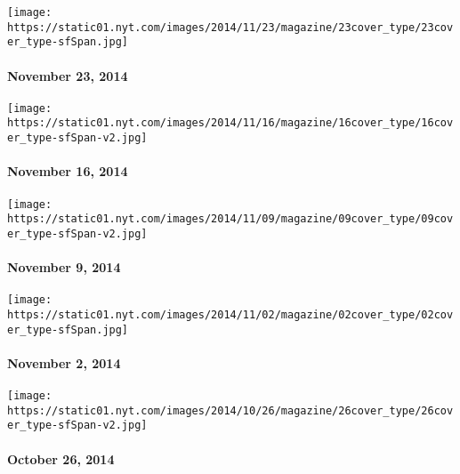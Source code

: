 \texttt{[image: https://static01.nyt.com/images/2014/11/23/magazine/23cover\_type/23cover\_type-sfSpan.jpg]}

\hypertarget{november-23-2014}{%
\paragraph{November 23, 2014}\label{november-23-2014}}

\href{http://www.nytimes.com/indexes/2014/11/16/magazine/index.html}{}

\texttt{[image: https://static01.nyt.com/images/2014/11/16/magazine/16cover\_type/16cover\_type-sfSpan-v2.jpg]}

\hypertarget{november-16-2014}{%
\paragraph{November 16, 2014}\label{november-16-2014}}

\href{http://www.nytimes.com/indexes/2014/11/09/magazine/index.html}{}

\texttt{[image: https://static01.nyt.com/images/2014/11/09/magazine/09cover\_type/09cover\_type-sfSpan-v2.jpg]}

\hypertarget{november-9-2014}{%
\paragraph{November 9, 2014}\label{november-9-2014}}

\href{http://www.nytimes.com/indexes/2014/11/02/magazine/index.html}{}

\texttt{[image: https://static01.nyt.com/images/2014/11/02/magazine/02cover\_type/02cover\_type-sfSpan.jpg]}

\hypertarget{november-2-2014}{%
\paragraph{November 2, 2014}\label{november-2-2014}}

\href{http://www.nytimes.com/indexes/2014/10/26/magazine/index.html}{}

\texttt{[image: https://static01.nyt.com/images/2014/10/26/magazine/26cover\_type/26cover\_type-sfSpan-v2.jpg]}

\hypertarget{october-26-2014}{%
\paragraph{October 26, 2014}\label{october-26-2014}}

